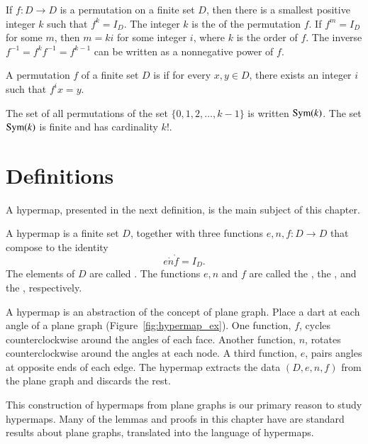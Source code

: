 If $f:D\to D$ is a permutation on a finite set $D$, then there is a
smallest positive integer $k$ such that $f^k=I_D$.  The integer $k$ is
the  of the permutation $f$.  If $f^m=I_D$ for some
$m$, then $m = k i$ for some integer $i$, where $k$ is the order of
$f$. The inverse $f^{-1} = f^k f^{-1} = f^{k-1}$ can be written as a
nonnegative power of $f$.

A permutation $f$ of a finite set $D$ is  
if for every $x,y\in D$, there exists an integer $i$ such that
$f^i x = y$.

The set of all permutations of the set $\{0,1,2,\ldots,k-1\}$ is written ${\operatorname{Sym}}(k)$.
The set ${\operatorname{Sym}}(k)$ is finite and has cardinality $k!$.



\section{Definitions}

A hypermap, presented in the next definition, is the main subject of this chapter.

\begin{definition}\label{def:hypermap}  
  A hypermap is a finite set $D$, together with three functions
  $e,n,f:D\to D$ that compose to the identity
  \[ 
e\ocirc n\ocirc f = I_D.
\]  The
elements of $D$ are called .  The functions $e,n$ and
$f$ are called the , the , and
the , respectively.  %
%
%
%
%
\end{definition}


\begin{remark}\label{rem:hypermap} 
  A hypermap is an abstraction of the concept of plane graph.  Place a
  dart at each angle of a plane graph (Figure~\ref{fig:hypermap_ex}).
  One function, $f$, cycles counterclockwise around the angles of each
  face.  Another function, $n$, rotates counterclockwise around the
  angles at each node.  A third function, $e$, pairs angles at
  opposite ends of each edge.  The hypermap extracts the data
  $(D,e,n,f)$ from the plane graph and discards the rest.

  This construction of hypermaps from plane graphs is our primary
  reason to study hypermaps.  Many of the lemmas and proofs in this
  chapter have are standard results about plane graphs, translated
  into the language of hypermaps.  
%
%
\end{remark}


